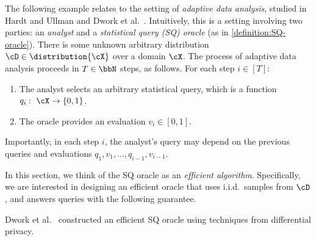 The following example relates to the setting of \emph{adaptive data analysis}, studied in Hardt and Ullman \cite{DBLP:conf/focs/HardtU14} and Dwork et al.\ \cite{DBLP:conf/stoc/DworkFHPRR15}. Intuitively, this is a setting involving two parties: an \emph{analyst} and a \emph{statistical query (SQ) oracle} (as in \cref{definition:SQ-oracle}). There is some unknown arbitrary distribution $\cD \in \distribution{\cX}$ over a domain $\cX$. The process of adaptive data analysis proceeds in $T \in \bbN$ steps, as follows. For each step $i \in [T]$:
\begin{enumerate}
	\item{
		The analyst selects an arbitrary statistical query, which is a function $q_i: ~ \cX \to \{0,1\}$.
	}
	\item{
		The oracle provides an evaluation $v_i \in [0,1]$.
	}
\end{enumerate}
Importantly, in each step $i$, the analyst's query may depend on the previous queries and evaluations $q_1,v_1,\dots,q_{i-1},v_{i-1}$. 

In this section, we think of the SQ oracle as an \emph{efficient algorithm}. Specifically, we are interested in designing an efficient oracle that uses i.i.d.\ samples from $\cD$, and answers queries with the following guarantee.


Dwork et al.\ \cite{DBLP:conf/stoc/DworkFHPRR15} constructed an efficient SQ oracle using techniques from differential privacy.


